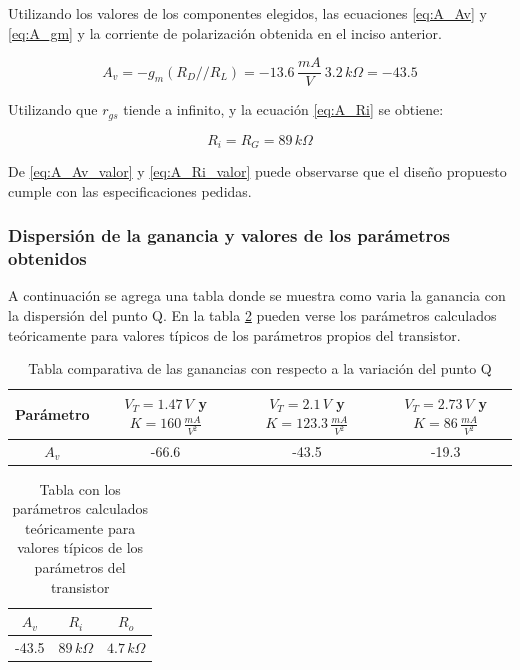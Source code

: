 \documentclass[10pt,spanish,a4paper,notitlepage]{article}
\begin{document}
Utilizando los valores de los componentes elegidos, las ecuaciones \ref{eq:A_Av} y \ref{eq:A_gm} y la corriente de polarización obtenida en el inciso anterior.

\begin{equation}
    A_v=-g_m(R_D//R_L)=-13.6\,\unit{\frac{mA}{V}}\ 3.2\,\unit{k\Omega}=-43.5
    \label{eq:A_Av_valor}
\end{equation}

Utilizando que $r_{gs}$ tiende a infinito, y la ecuación \ref{eq:A_Ri} se obtiene:

\begin{equation}
    R_{i}=R_{G}=89\,\unit{k\Omega}
    \label{eq:A_Ri_valor}
\end{equation}

De \ref{eq:A_Av_valor} y \ref{eq:A_Ri_valor} puede observarse que el diseño propuesto cumple con las especificaciones pedidas. 

\subsubsection{Dispersión de la ganancia y valores de los parámetros obtenidos}

A continuación se agrega una tabla donde se muestra como varia la ganancia con la dispersión del punto Q. En la tabla  \ref{table:param_teo} pueden verse los parámetros calculados teóricamente para valores típicos de los parámetros propios del transistor.

\begin{table}[H]
    \centering
    \begin{tabular}{|c|c|c|c|} %
    \hline
    Parámetro & $V_{T}=1.47\,\unit{V}$ y $K=160\,\unit{\frac{mA}{V^2}}$ & $V_{T}=2.1\,\unit{V}$ y $K=123.3\,\unit{\frac{mA}{V^2}}$ & $V_{T}=2.73\,\unit{V}$ y $K=86\,\unit{\frac{mA}{V^2}}$  \\ \hline
    $A_v$ & -66.6 & -43.5 & -19.3    \\ \hline
    \end{tabular}
    \caption{Tabla comparativa de las ganancias con respecto a la variación del punto Q }
    \label{table:tabla_AvQ}
    \end{table}

\begin{table}[H]
    \centering
    \begin{tabular}{|c|c|c|} %
    \hline
    $A_v$ & $R_i$  & $R_o$ \\ \hline
     -43.5 & $89\,\unit{k\Omega}$  & $4.7\,\unit{k\Omega}$   \\ \hline
    \end{tabular}
    \caption{Tabla con los parámetros calculados teóricamente para valores típicos de los parámetros del transistor}
    \label{table:param_teo}
    \end{table}
\end{document}
